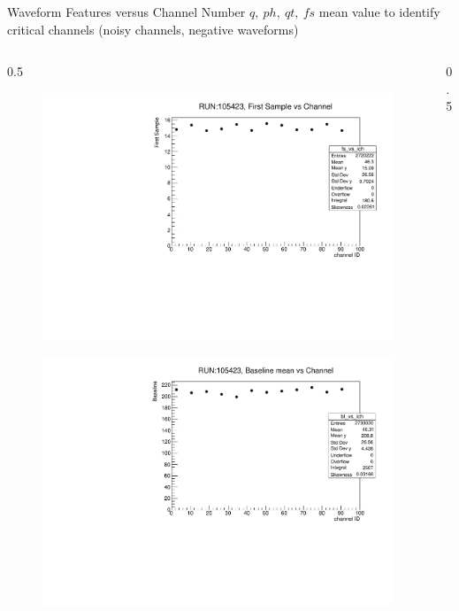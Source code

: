 \documentclass{beamer}[10pt]
\begin{document}
\begin{frame}{Waveform Features versus Channel Number}
$q, \ ph, \ qt, \ fs$ mean value to identify critical channels (noisy channels, negative waveforms)
\begin{columns}
\begin{column}{0.5\framewidth}
\begin{figure}[H]
   \centering
   \includegraphics[width= 1.0\columnwidth]{figures/pdf/fs_vs_ch.pdf}
   \label{fig:wffytl}
 \end{figure}
\begin{figure}[H]
   \centering
   \includegraphics[width= 1.0\columnwidth]{figures/pdf/bl_vs_ch.pdf}
   \label{fig:wffytl}
 \end{figure}
\end{column}
\begin{column}{0.5\framewidth}

\end{column}
\end{columns}
\end{frame}
\end{document}

